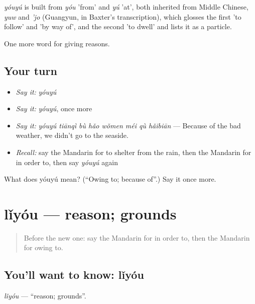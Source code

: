 \begin{cousinweb}
\emph{yóuyú} is built from \emph{yóu} 'from' and \emph{yú} 'at', both inherited from Middle Chinese, \emph{yuw} and \emph{'jo} (Guangyun, in Baxter's transcription), which glosses the first 'to follow' and 'by way of', and the second 'to dwell' and lists it as a particle.
\end{cousinweb}

\begin{grammarlens}[title={What you've built}]
One more word for giving reasons.
\end{grammarlens}

\subsection*{Your turn}
\begin{itemize}
\raggedright
  \item \emph{Say it:} \emph{yóuyú}
  \item \emph{Say it:} \emph{yóuyú}, once more
  \item \emph{Say it:} \emph{yóuyú tiānqì bù hǎo wǒmen méi qù hǎibiān} — Because of the bad weather, we didn't go to the seaside.
  \item \emph{Recall:} say the Mandarin for to shelter from the rain, then the Mandarin for in order to, then say \emph{yóuyú} again
\end{itemize}

\begin{tcolorbox}[breakable,colback=teal!4,colframe=teal!35!black,title={Before you move on}]
What does yóuyú mean? (\textquotedblleft{}Owing to; because of\textquotedblright{}.) Say it once more.
\end{tcolorbox}
\section[lǐyóu]{lǐyóu — reason; grounds}

\label{lesson:ZH-C235-liyou}



\begin{quote}
Before the new one: say the Mandarin for in order to, then the Mandarin for owing to.
\end{quote}

\subsection*{You'll want to know: lǐyóu}
\emph{lǐyóu} — \textquotedblleft{}reason; grounds\textquotedblright{}.

